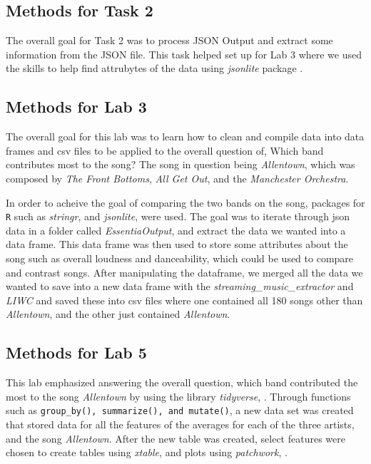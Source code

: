 \documentclass{article}\usepackage[]{graphicx}\usepackage[]{xcolor}
\begin{document}
\begin{multicols}{2}
\subsection{Methods for Task 2}
The overall goal for Task 2 was to process JSON Output and extract some information from the JSON file. This task helped set up for Lab 3 where we used the skills to help find attrubytes of the data using \emph{jsonlite} package \citep{jsonlite}.

\subsection{Methods for Lab 3}
The overall goal for this lab was to learn how to clean and compile data into data frames and csv files to be applied to the overall question of, Which band contributes most to the song? The song in question being \emph{Allentown}, which was composed by \emph{The Front Bottoms}, \emph{All Get Out}, and the \emph{Manchester Orchestra}. 

In order to acheive the goal of comparing the two bands on the song, packages for \texttt{R} such as \emph{stringr}, \citep{stringr} and \emph{jsonlite}, \citep{jsonlite} were used. The goal was to iterate through json data in a folder called \emph{EssentiaOutput}, and extract the data we wanted into a data frame. This data frame was then used to store some attributes about the song such as overall loudness and danceability, which could be used to compare and contrast songs. After manipulating the dataframe, we merged all the data we wanted to save into a new data frame with the \emph{streaming\_music\_extractor} and \emph{LIWC} and saved these into csv files where one contained all 180 songs other than \emph{Allentown}, and the other just contained \emph{Allentown}. 

\subsection{Methods for Lab 5}
This lab emphasized answering the overall question, which band contributed the most to the song \emph{Allentown} by using the library \emph{tidyverse}, \citep{tidyverse}. Through functions such as \texttt{group\_by(), summarize(), and mutate()}, a new data set was created that stored data for all the features of the averages for each of the three artists, and the song \emph{Allentown}. After the new table was created, select features were chosen to create tables using \emph{xtable},\citep{xtable} and plots using \emph{patchwork}, \citep{patchwork}.


\end{multicols}
\end{document}

